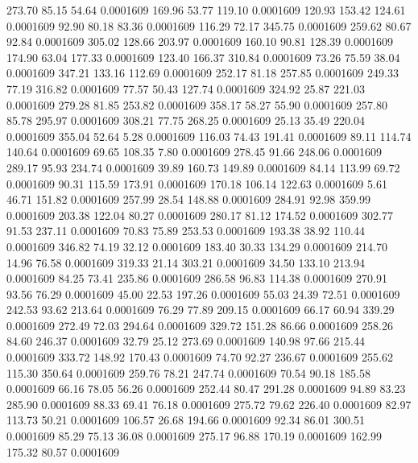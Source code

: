  273.70   85.15   54.64   0.0001609
 169.96   53.77  119.10   0.0001609
 120.93  153.42  124.61   0.0001609
  92.90   80.18   83.36   0.0001609
 116.29   72.17  345.75   0.0001609
 259.62   80.67   92.84   0.0001609
 305.02  128.66  203.97   0.0001609
 160.10   90.81  128.39   0.0001609
 174.90   63.04  177.33   0.0001609
 123.40  166.37  310.84   0.0001609
  73.26   75.59   38.04   0.0001609
 347.21  133.16  112.69   0.0001609
 252.17   81.18  257.85   0.0001609
 249.33   77.19  316.82   0.0001609
  77.57   50.43  127.74   0.0001609
 324.92   25.87  221.03   0.0001609
 279.28   81.85  253.82   0.0001609
 358.17   58.27   55.90   0.0001609
 257.80   85.78  295.97   0.0001609
 308.21   77.75  268.25   0.0001609
  25.13   35.49  220.04   0.0001609
 355.04   52.64    5.28   0.0001609
 116.03   74.43  191.41   0.0001609
  89.11  114.74  140.64   0.0001609
  69.65  108.35    7.80   0.0001609
 278.45   91.66  248.06   0.0001609
 289.17   95.93  234.74   0.0001609
  39.89  160.73  149.89   0.0001609
  84.14  113.99   69.72   0.0001609
  90.31  115.59  173.91   0.0001609
 170.18  106.14  122.63   0.0001609
   5.61   46.71  151.82   0.0001609
 257.99   28.54  148.88   0.0001609
 284.91   92.98  359.99   0.0001609
 203.38  122.04   80.27   0.0001609
 280.17   81.12  174.52   0.0001609
 302.77   91.53  237.11   0.0001609
  70.83   75.89  253.53   0.0001609
 193.38   38.92  110.44   0.0001609
 346.82   74.19   32.12   0.0001609
 183.40   30.33  134.29   0.0001609
 214.70   14.96   76.58   0.0001609
 319.33   21.14  303.21   0.0001609
  34.50  133.10  213.94   0.0001609
  84.25   73.41  235.86   0.0001609
 286.58   96.83  114.38   0.0001609
 270.91   93.56   76.29   0.0001609
  45.00   22.53  197.26   0.0001609
  55.03   24.39   72.51   0.0001609
 242.53   93.62  213.64   0.0001609
  76.29   77.89  209.15   0.0001609
  66.17   60.94  339.29   0.0001609
 272.49   72.03  294.64   0.0001609
 329.72  151.28   86.66   0.0001609
 258.26   84.60  246.37   0.0001609
  32.79   25.12  273.69   0.0001609
 140.98   97.66  215.44   0.0001609
 333.72  148.92  170.43   0.0001609
  74.70   92.27  236.67   0.0001609
 255.62  115.30  350.64   0.0001609
 259.76   78.21  247.74   0.0001609
  70.54   90.18  185.58   0.0001609
  66.16   78.05   56.26   0.0001609
 252.44   80.47  291.28   0.0001609
  94.89   83.23  285.90   0.0001609
  88.33   69.41   76.18   0.0001609
 275.72   79.62  226.40   0.0001609
  82.97  113.73   50.21   0.0001609
 106.57   26.68  194.66   0.0001609
  92.34   86.01  300.51   0.0001609
  85.29   75.13   36.08   0.0001609
 275.17   96.88  170.19   0.0001609
 162.99  175.32   80.57   0.0001609
